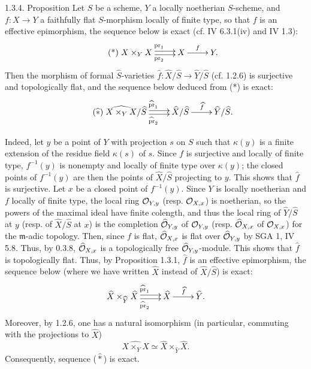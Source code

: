 \begin{enonce}{1.3.4. Proposition}{}\label{VIIB.1.3.4}
Let $S$ be a scheme, $Y$ a locally noetherian $S$-scheme, and $f:X\to Y$ a faithfully flat $S$-morphism locally of finite type, so that $f$ is an effective epimorphism, \ie the sequence below is exact (cf. IV 6.3.1(iv) and IV 1.3):
\begin{equation}\tag{*}
\xymatrix{X\times_Y X\ar@<.5ex>[r]^{\mathrm{pr}_1}\ar@<-.5ex>[r]_{\mathrm{pr}_2}&X\ar[r]^f&Y.}
\end{equation}
Then the morphism of formal $\widehat S$-varieties $\widehat f:\widehat X/\widehat S\to\widehat Y/\widehat S$ (cf. 1.2.6) is surjective and topologically flat, and the sequence below deduced from (*) is exact:
\begin{equation}\tag{$\widehat *$}
\xymatrix{\widehat{X\times_Y X}/\widehat S\ar@<.5ex>[r]^{\widehat{\mathrm{pr}}_1}\ar@<-.5ex>[r]_{\widehat{\mathrm{pr}}_2}&\widehat X/\widehat S\ar[r]^{\widehat f}&\widehat Y/\widehat S.}
\end{equation}
\end{enonce}
Indeed, let $y$ be a point of $Y$ with projection $s$ on $S$ such that $\kappa(y)$ is a finite extension of the residue field $\kappa(s)$ of $s$. Since $f$ is surjective and locally of finite type, $f^{-1}(y)$ is nonempty and locally of finite type over $\kappa(y)$; the closed points of $f^{-1}(y)$ are then the points of $\widehat X/\widehat S$ projecting to $y$. This shows that $\widehat f$ is surjective.
Let $x$ be a closed point of $f^{-1}(y)$. Since $Y$ is locally noetherian and $f$ locally of finite type, the local ring $\mathcal{O}_{Y,y}$ (resp. $\mathcal{O}_{X,x}$) is noetherian, so the powers of the maximal ideal have finite colength, and thus the local ring of $\widehat Y/\widehat S$ at $y$ (resp. of $\widehat X/\widehat S$ at $x$) is the completion $\widehat{\mathcal{O}}_{Y,y}$ of $\mathcal{O}_{Y,y}$ (resp. $\widehat{\mathcal{O}}_{X,x}$ of $\mathcal{O}_{X,x}$) for the $\mathfrak m$-adic topology. Then, since $f$ is flat, $\widehat{\mathcal{O}}_{X,x}$ is flat over $\widehat{\mathcal{O}}_{Y,y}$ by SGA 1, IV 5.8. Thus, by 0.3.8, $\widehat{\mathcal{O}}_{X,x}$ is a topologically free $\widehat{\mathcal{O}}_{Y,y}$-module. This shows that $\widehat f$ is topologically flat.
Thus, by Proposition 1.3.1, $\widehat f$ is an effective epimorphism, \ie the sequence below (where we have written $\widehat X$ instead of $\widehat X/\widehat S$) is exact:
\[
\xymatrix{\widehat X\times_{\widehat Y}\widehat X\ar@<.5ex>[r]^{\widehat{\mathrm{pr}}_1}\ar@<-.5ex>[r]_{\widehat{\mathrm{pr}}_2}&\widehat X\ar[r]^{\widehat f}&\widehat Y.}
\]
Moreover, by 1.2.6, one has a natural isomorphism (in particular, commuting with the projections to $\widehat X$)
\[
\widehat{X\times_Y X}\simeq\widehat X\times_{\widehat Y}\widehat X.
\]
Consequently, sequence ($\widehat *$) is exact.

